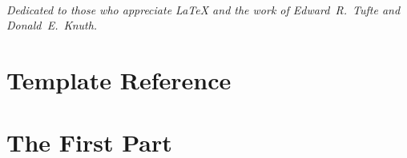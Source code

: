 \documentclass[nofonts,nohyper,nobib]{tufte-book}
\begin{document}
\tableofcontents


\listoffigures

\listoftables

\cleardoublepage
~\vfill
\begin{doublespace}
\noindent\fontsize{18}{22}\selectfont\itshape
\nohyphenation
Dedicated to those who appreciate \LaTeX{} 
and the work of \mbox{Edward R.~Tufte} 
and \mbox{Donald E.~Knuth}.
\end{doublespace}
\vfill
\vfill


\mainmatter

\part{Template Reference}


\part{The First Part}












\backmatter



\printindex


\end{document}
